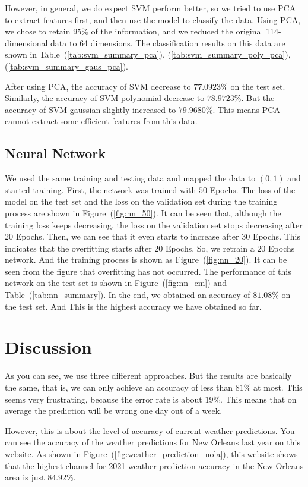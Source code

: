 \documentclass[11pt, a4paper, jou]{apa7}
\begin{document}
    However, in general, we do expect SVM perform better, so we tried to use PCA to extract features first, and then use the model to classify the data. Using PCA, we chose to retain $95\%$ of the information, and we reduced the original 114-dimensional data to 64 dimensions. The classification results on this data are shown in Table~(\ref{tab:svm_summary_pca}), (\ref{tab:svm_summary_poly_pca}), (\ref{tab:svm_summary_gaus_pca}). 

    After using PCA, the accuracy of SVM decrease to $77.0923\%$ on the test set. Similarly, the accuracy of SVM polynomial decrease to $78.9723\%$. But the accuracy of SVM gaussian slightly increased to $79.9680\%$. This means PCA cannot extract some efficient features from this data.

\subsection{Neural Network}
We used the same training and testing data and mapped the data to $(0,1)$ and started training. First, the network was trained with $50$ Epochs. The loss of the model on the test set and the loss on the validation set during the training process are shown in Figure~(\ref{fig:nn_50}). It can be seen that, although the training loss keeps decreasing, the loss on the validation set stops decreasing after $20$ Epochs. Then, we can see that it even starts to increase after $30$ Epochs. This indicates that the overfitting starts after $20$ Epochs. So, we retrain a $20$ Epochs network. And the training process is shown as Figure~(\ref{fig:nn_20}). It can be seen from the figure that overfitting has not occurred. The performance of this network on the test set is shown in Figure~(\ref{fig:nn_cm}) and Table~(\ref{tab:nn_summary}). In the end, we obtained an accuracy of $81.08\%$ on the test set. And This is the highest accuracy we have obtained so far.

\section{Discussion}

As you can see, we use three different approaches. But the results are basically the same, that is, we can only achieve an accuracy of less than $81\%$ at most. This seems very frustrating, because the error rate is about $19\%$. This means that on average the prediction will be wrong one day out of a week. 

However, this is about the level of accuracy of current weather predictions. You can see the accuracy of the weather predictions for New Orleans last year on this \href{https://www.forecastadvisor.com/Louisiana/NewOrleans/70112/}{website}. As shown in Figure~(\ref{fig:weather_prediction_nola}), this website shows that the highest channel for 2021 weather prediction accuracy in the New Orleans area is just $84.92\%$. 
\end{document}
